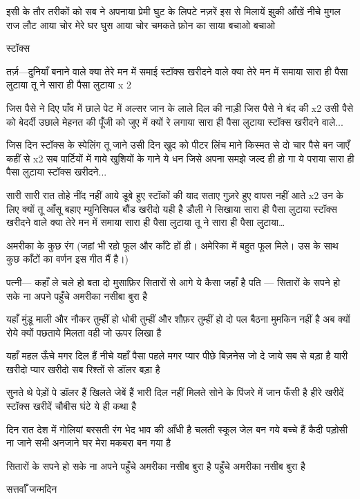 इसी के तौर तरीकों को सब ने अपनाया
प्रेमी घुट के लिपटे नज़रें इस से मिलायें
झुकी आँखें नीचे मुगल राज लौट आया
चोर मेरे घर घुस आया
चोर चमकते फ़ोन का साया
बचाओ बचाओ


स्टॉक्स

तर्ज़—दुनियाँ बनाने वाले क्या तेरे मन में
समाई
स्टॉक्स खरीदने वाले क्या तेरे मन में समाया
सारा ही पैसा लुटाया तू ने
सारा ही पैसा लुटाया x 2

जिस पैसे ने दिए पाँव में छाले
पेट में अल्सर जान के लाले
दिल की नाड़ी जिस पैसे ने बंद की x2
उसी पैसे को बेदर्दी उछाले
मेहनत की पूँजी को
जुए में क्यों रे लगाया
सारा ही पैसा लुटाया
स्टॉक्स खरीदने वाले...



जिस दिन स्टॉक्स के स्पेलिंग तू जाने
उसी दिन खुद को पीटर लिंच माने
किस्मत से दो चार पैसे बन जाएँ कहीं से x2
सब पार्टियों में गाये खुशियों के गाने
ये धन जिसे अपना समझे
जल्द ही हो गा ये पराया
सारा ही पैसा लुटाया
स्टॉक्स खरीदने...



सारी सारी रात तोहे नींद नहीं आये
डूबे हुए स्टॉकों की याद सताए
गुज़रे हुए वापस नहीं आते x2
उन के लिए क्यों तू आँसू बहाए
म्युनिसिपल बौंड खरीदो
यही है डौली ने सिखाया
सारा ही पैसा लुटाया
स्टॉक्स खरीदने वाले
क्या तेरे मन में समाया
सारा ही पैसा लुटाया
तू ने सारा ही पैसा लुटाया…

अमरीका के कुछ रंग
(जहां भी रहो फूल और काँटे हों ही। अमेरिका में बहुत फूल मिले। उस के साथ कुछ काँटों का वर्णन इस गीत मैं है।) 

पत्नी—
कहाँ ले चले हो बता दो मुसाफ़िर
सितारों से आगे ये कैसा जहाँ है
पति —
सितारों के सपने हो सके ना अपने
पहुँचे अमरीका नसीबा बुरा है

यहाँ मुंडू माली और नौकर तुम्हीं हो
धोबी तुम्हीं और शौफ़र तुम्हीं हो
दो पल बैठना मुमकिन नहीं है
अब क्यों रोये क्यों पछताये
मिलता वही जो ऊपर लिखा है

यहाँ महल ऊँचे मगर दिल हैं नीचे
यहाँ पैसा पहले मगर प्यार पीछे
बिज़नेस जो दे जाये सब से बड़ा है
यारी खरीदो प्यार खरीदो
सब रिश्तों से डॉलर बड़ा है

सुनते थे पेड़ों पे डॉलर हैं खिलते
जेबें हैं भारी दिल नहीं मिलते
सोने के पिंजरे में जान फँसी है
हीरे खरीदें स्टॉक्स खरीदें
चौबीस घंटे ये ही कथा है


दिन रात देश में गोलियां बरसती
रंग भेद भाव की आँधी है चलती
स्कूल जेल बन गये बच्चे हैं कैदी
पड़ोसी ना जाने सभी अनजाने
घर मेरा मकबरा बन गया है

सितारों के सपने हो सके ना अपने
पहुँचे अमरीका नसीब बुरा है
पहुँचे अमरीका नसीब बुरा है

सत्तर्वाँ जन्मदिन

